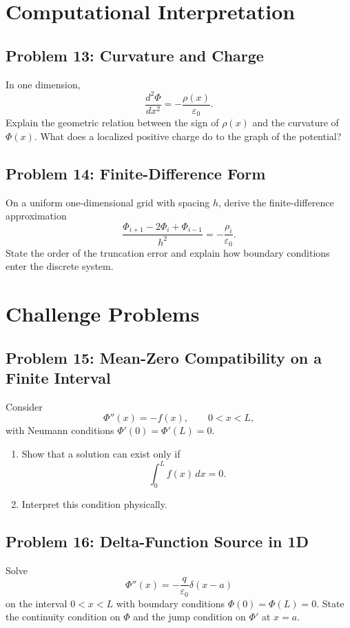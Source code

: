 \documentclass[hidelinks]{article}
\begin{document}
\section{Computational Interpretation}
\subsection{Problem 13: Curvature and Charge}
In one dimension,
\[
\frac{d^2\Phi}{dx^2}=-\frac{\rho(x)}{\varepsilon_0}.
\]
Explain the geometric relation between the sign of $\rho(x)$ and the curvature of $\Phi(x)$. What does a localized positive charge do to the graph of the potential?

\subsection{Problem 14: Finite-Difference Form}
On a uniform one-dimensional grid with spacing $h$, derive the finite-difference approximation
\[
\frac{\Phi_{i+1}-2\Phi_i+\Phi_{i-1}}{h^2}=-\frac{\rho_i}{\varepsilon_0}.
\]
State the order of the truncation error and explain how boundary conditions enter the discrete system.

\section{Challenge Problems}
\subsection{Problem 15: Mean-Zero Compatibility on a Finite Interval}
Consider
\[
\Phi''(x)=-f(x), \qquad 0<x<L,
\]
with Neumann conditions $\Phi'(0)=\Phi'(L)=0$.
\begin{enumerate}[label=\alph*)]
\item Show that a solution can exist only if
\[
\int_0^L f(x)\,dx=0.
\]
\item Interpret this condition physically.
\end{enumerate}

\subsection{Problem 16: Delta-Function Source in 1D}
Solve
\[
\Phi''(x)=-\frac{q}{\varepsilon_0}\delta(x-a)
\]
on the interval $0<x<L$ with boundary conditions $\Phi(0)=\Phi(L)=0$.
State the continuity condition on $\Phi$ and the jump condition on $\Phi'$ at $x=a$.
\end{document}
